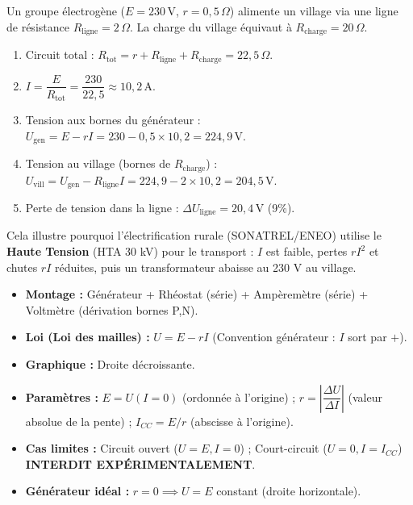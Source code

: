 \documentclass[11pt]{article}
\begin{document}
\begin{exemplebox}
Un groupe électrogène ($E = 230\,\text{V}$, $r = 0,5\,\Omega$) alimente un village via une ligne de résistance $R_{\text{ligne}} = 2\,\Omega$. La charge du village équivaut à $R_{\text{charge}} = 20\,\Omega$.
\begin{enumerate}
    \item Circuit total : $R_{\text{tot}} = r + R_{\text{ligne}} + R_{\text{charge}} = 22,5\,\Omega$.
    \item $I = \dfrac{E}{R_{\text{tot}}} = \dfrac{230}{22,5} \approx 10,2\,\text{A}$.
    \item Tension aux bornes du générateur : $U_{\text{gen}} = E - rI = 230 - 0,5 \times 10,2 = 224,9\,\text{V}$.
    \item Tension au village (bornes de $R_{\text{charge}}$) : $U_{\text{vill}} = U_{\text{gen}} - R_{\text{ligne}}I = 224,9 - 2 \times 10,2 = 204,5\,\text{V}$.
    \item Perte de tension dans la ligne : $\Delta U_{\text{ligne}} = 20,4\,\text{V}$ (9\%).
\end{enumerate}
Cela illustre pourquoi l'électrification rurale (SONATREL/ENEO) utilise le \textbf{Haute Tension} (HTA 30 kV) pour le transport : $I$ est faible, pertes $rI^2$ et chutes $rI$ réduites, puis un transformateur abaisse au 230 V au village.
\end{exemplebox}

\begin{aretenir}[Bilan : Caractéristique $U = f(I)$ d'un générateur]
\begin{itemize}
    \item \textbf{Montage :} Générateur + Rhéostat (série) + Ampèremètre (série) + Voltmètre (dérivation bornes P,N).
    \item \textbf{Loi (Loi des mailles) :} $\boxed{U = E - rI}$ (Convention générateur : $I$ sort par $+$).
    \item \textbf{Graphique :} Droite décroissante.
    \item \textbf{Paramètres :} $E = U(I=0)$ (ordonnée à l'origine) ; $r = \left|\dfrac{\Delta U}{\Delta I}\right|$ (valeur absolue de la pente) ; $I_{CC} = E/r$ (abscisse à l'origine).
    \item \textbf{Cas limites :} Circuit ouvert ($U=E, I=0$) ; Court-circuit ($U=0, I=I_{CC}$) \textbf{INTERDIT EXPÉRIMENTALEMENT}.
    \item \textbf{Générateur idéal :} $r=0 \implies U=E$ constant (droite horizontale).
\end{itemize}
\end{aretenir}
\end{document}
